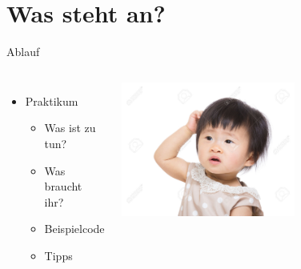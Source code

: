 
\section{Was steht an?}
\begin{frame}{Ablauf}
  \begin{columns}
    \begin{itemize}
      \item Praktikum
            \begin{itemize}
              \item Was ist zu tun?
              \item Was braucht ihr?
              \item Beispielcode
              \item Tipps
            \end{itemize}
    \end{itemize}
    \includegraphics[width=0.6\textwidth]{kratzen}
  \end{columns}
\end{frame}


